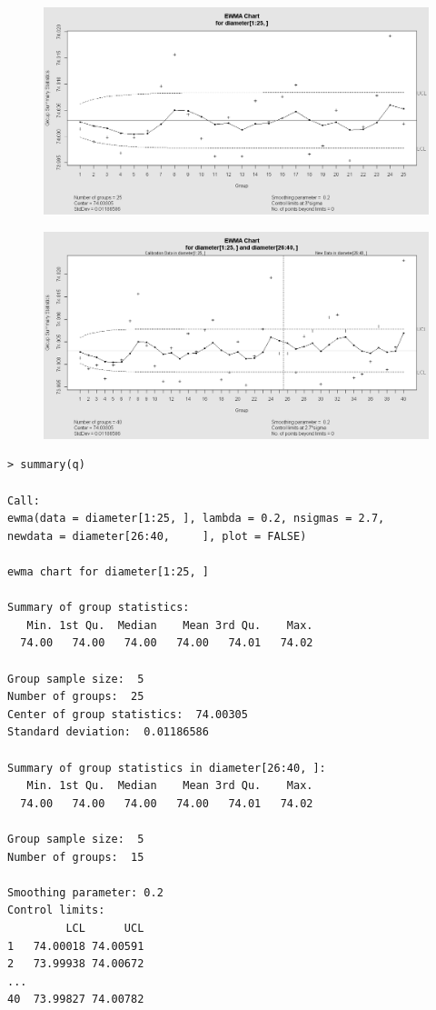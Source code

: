 \documentclass[]{article}
\begin{document}
\begin{figure}[h!]
\centering
\includegraphics[width=0.6\linewidth]{./qccEWMA1}
\caption{}
\label{fig:qccEWMA1}
\end{figure}
\begin{figure}[h!]
\centering
\includegraphics[width=0.6\linewidth]{./qccEWMA2}
\caption{}
\label{fig:qccEWMA2}
\end{figure}
\begin{verbatim}
> summary(q)

Call:
ewma(data = diameter[1:25, ], lambda = 0.2, nsigmas = 2.7, 
newdata = diameter[26:40,     ], plot = FALSE)

ewma chart for diameter[1:25, ] 

Summary of group statistics:
   Min. 1st Qu.  Median    Mean 3rd Qu.    Max. 
  74.00   74.00   74.00   74.00   74.01   74.02 

Group sample size:  5
Number of groups:  25
Center of group statistics:  74.00305
Standard deviation:  0.01186586 

Summary of group statistics in diameter[26:40, ]:
   Min. 1st Qu.  Median    Mean 3rd Qu.    Max. 
  74.00   74.00   74.00   74.00   74.01   74.02 

Group sample size:  5
Number of groups:  15 

Smoothing parameter: 0.2 
Control limits:
         LCL      UCL
1   74.00018 74.00591
2   73.99938 74.00672
...                  
40  73.99827 74.00782

\end{verbatim}
\newpage
\end{document}

